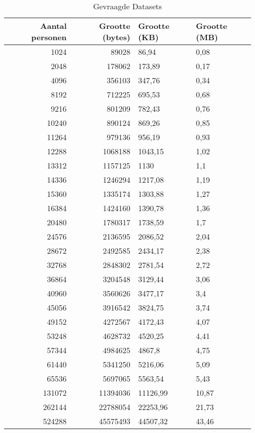 \begin{table}
    \centering
    \begin{tabular}{rrll}
        \toprule
        \textbf{Aantal personen} & \textbf{Grootte (bytes)} & \textbf{Grootte (KB)} & \textbf{Grootte (MB)} \\
        \midrule
        1024 & 89028 & 86,94 & 0,08 \\
        2048 & 178062 & 173,89 & 0,17 \\
        4096 & 356103 & 347,76 & 0,34 \\
        8192 & 712225 & 695,53 & 0,68 \\
        9216 & 801209 & 782,43 & 0,76 \\
        10240 & 890124 & 869,26 & 0,85 \\
        11264 & 979136 & 956,19 & 0,93 \\
        12288 & 1068188 & 1043,15 & 1,02 \\
        13312 & 1157125 & 1130 & 1,1 \\
        14336 & 1246294 & 1217,08 & 1,19 \\
        15360 & 1335174 & 1303,88 & 1,27 \\
        16384 & 1424160 & 1390,78 & 1,36 \\
        20480 & 1780317 & 1738,59 & 1,7 \\
        24576 & 2136595 & 2086,52 & 2,04 \\
        28672 & 2492585 & 2434,17 & 2,38 \\
        32768 & 2848302 & 2781,54 & 2,72 \\
        36864 & 3204548 & 3129,44 & 3,06 \\
        40960 & 3560626 & 3477,17 & 3,4 \\
        45056 & 3916542 & 3824,75 & 3,74 \\
        49152 & 4272567 & 4172,43 & 4,07 \\
        53248 & 4628732 & 4520,25 & 4,41 \\
        57344 & 4984625 & 4867,8 & 4,75 \\
        61440 & 5341250 & 5216,06 & 5,09 \\
        65536 & 5697065 & 5563,54 & 5,43 \\
        131072 & 11394036 & 11126,99 & 10,87 \\
        262144 & 22788054 & 22253,96 & 21,73 \\
        524288 & 45575493 & 44507,32 & 43,46 \\
        \bottomrule
    \end{tabular}
    \caption{Gevraagde Datasets}
    \label{tab:Gevraagdedatasets}
\end{table}


